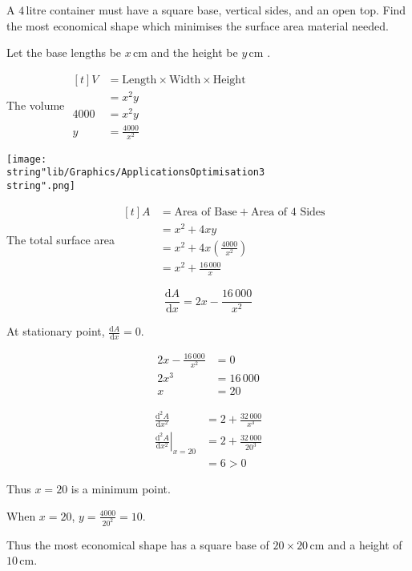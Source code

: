 \documentclass[11pt,a4paper]{book}
\begin{document}
\begin{example}
A $4\,\text{litre}$ container must have a square base, vertical sides,
and an open top. Find the most economical shape which minimises the
surface area material needed.

\Solution

\begin{minipage}[t]{0.7\textwidth}

Let the base lengths be $x\,\text{cm}$ and the height be $y\,\text{cm}$
.

The volume
$
\begin{aligned}[t]
V & =\text{Length}\times\text{Width}\times\text{Height}\\
 & =x^{2}y\\
4000 & =x^{2}y\\
y & =\frac{4000}{x^{2}}
\end{aligned}
$

\end{minipage}
\begin{minipage}[t]{0.3\textwidth}
\begin{center}
\texttt{[image: \\string"lib/Graphics/ApplicationsOptimisation3\\string".png]}
\par\end{center}

\end{minipage}

The total surface area
$
\begin{aligned}[t]
A & =\text{Area of Base}+\text{Area of 4 Sides}\\
 & =x^{2}+4xy\\
 & =x^{2}+4x\left(\frac{4000}{x^{2}}\right)\\
 & =x^{2}+\frac{16\,000}{x}
\end{aligned}
$

\[
\frac{\mathrm{d}A}{\mathrm{d}x}=2x-\frac{16\,000}{x^{2}}
\]

At stationary point, ${\displaystyle \frac{\mathrm{d}A}{\mathrm{d}x}}=0$.

\begin{align*}
2x-\frac{16\,000}{x^{2}} & =0\\
2x^{3} & =16\,000\\
x & =20
\end{align*}

\begin{align*}
\frac{\mathrm{d}^{2}A}{\mathrm{d}x^{2}} & =2+\frac{32\,000}{x^{3}}\\
\left.\frac{\mathrm{d}^{2}A}{\mathrm{d}x^{2}}\right|_{x=20} & =2+\frac{32\,000}{20^{3}}\\
 & =6>0
\end{align*}

Thus $x=20$ is a minimum point.

When $x=20$, ${\displaystyle y=\frac{4000}{20^{2}}=10}$.

Thus the most economical shape has a square base of $20\times20\,\text{cm}$
and a height of $10\,\text{cm}$.
\end{example}
\end{document}
